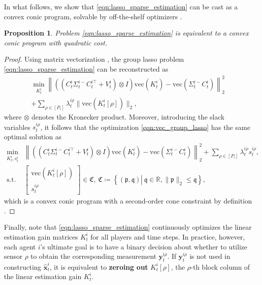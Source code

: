\documentclass[letterpaper, 10 pt, conference]{ieeeconf}  %
\newtheorem{proposition}{Proposition}
\begin{document}
In what follows, we show that \eqref{eqn:lasso_sparse_estimation} can be cast as a convex conic program, solvable by off-the-shelf optimizers \cite{Clarabel_2024}.
\begin{proposition}
Problem \eqref{eqn:lasso_sparse_estimation} is equivalent to a convex conic program with quadratic cost.
\end{proposition}
\begin{proof}
Using matrix vectorization \cite{macedo2013typing}, the group lasso problem \eqref{eqn:lasso_sparse_estimation} can be reconstructed as
\begin{multline}
        \min_{K_t^i}\left\|\left((C_t^i\Sigma_t^{i-}C_t^{i\top}+V_t^i)\otimes I\right)\text{vec}(K_t^i)-\text{vec}(\Sigma_t^{i-}C_t^i)\right\|_2^2\\
        +\sum_{\rho\in[P_i]}\lambda_t^{i\rho}\|\text{vec}(K_t^i[\rho])\|_2,\label{eqn:vec_group_lasso}
\end{multline}
where $\otimes$ denotes the Kronecker product. Moreover, introducing the slack variables $s_t^{i\rho}$, it follows that the optimization \eqref{eqn:vec_group_lasso} has the same optimal solution as 
\begin{align*}
        \min_{K_t^i, s_t^i}&\left\|\left((C_t^i\Sigma_t^{i-}C_t^{i\top}{+}V_t^i)\otimes I\right)\text{vec}(K_t^i){-}\text{vec}(\Sigma_t^{i-}C_t^i)\right\|_2^2{+}\sum_{\rho\in[P_i]}\lambda_t^{i\rho}s_t^{i\rho},\label{eqn:second-order_cone_optimization}\\
        \text{s.t.}\ &\begin{bmatrix}
            \text{vec}(K_t^i[\rho]) \\
            s_t^{i\rho}
        \end{bmatrix}\in\mathfrak{C},\ \mathfrak{C}\coloneqq\left\{(\mathfrak{p},\mathfrak{q})\left|\ \mathfrak{q}\in\mathbb{R}, \|\mathfrak{p}\|_2\leq \mathfrak{q}\right\}\right.,
\end{align*}
which is a convex conic program with a second-order cone constraint by definition \cite{boyd2004convex}. 
\end{proof}
Finally, note that \eqref{eqn:lasso_sparse_estimation} continuously optimizes the linear estimation gain matrices $K_t^i$ for all players and time steps. In practice, however, each agent $i$'s ultimate goal is to have a binary decision about whether to utilize sensor $\rho$ to obtain the corresponding measurement $\textbf{y}_t^{i\rho}$. If $\textbf{y}_t^{i\rho}$ is not used in constructing $\hat{\textbf{x}}_t^i$, it is equivalent to \textbf{zeroing out} $K_t^i[\rho]$, the $\rho$-th block column of the linear estimation gain $K_t^i$.
\end{document}
